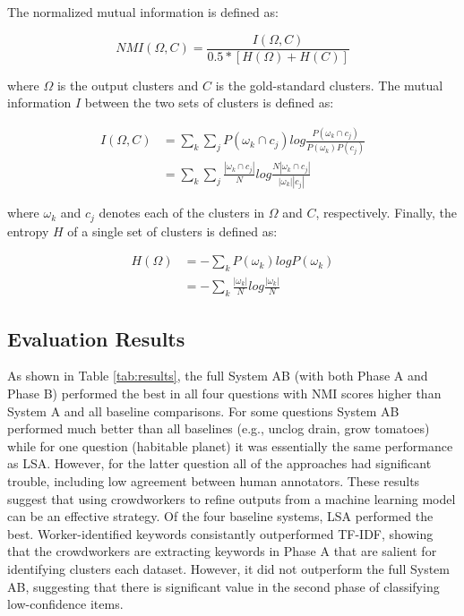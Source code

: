 The normalized mutual information is defined as:

\begin{equation}
NMI(\Omega, C) = \frac{I(\Omega, C)}{0.5 * [H(\Omega) + H(C)]}
\end{equation}

where $\Omega$ is the output clusters and $C$ is the gold-standard clusters.
The mutual information $I$ between the two sets of clusters is defined as:


\begin{equation}
	\begin{split}
I(\Omega, C) & = \sum_k \sum_j P(\omega_k \cap c_j) log \frac{P(\omega_k \cap c_j)}{P(\omega_k)P(c_j)} \\
             & = \sum_k \sum_j \frac{|\omega_k \cap c_j|}{N} log \frac{N|\omega_k \cap c_j|}{|\omega_k||c_j|}
	 \end{split}
 \end{equation}

where $\omega_k$ and $c_j$ denotes each of the clusters in $\Omega$ and $C$,
respectively.  Finally, the entropy $H$ of a single set of clusters is defined
as:

\begin{equation}
	\begin{split}
H(\Omega) & = - \sum_k P(\omega_k) log P(\omega_k) \\
          & = - \sum_k \frac{|\omega_k|}{N} log \frac{|\omega_k|}{N}
	\end{split}
\end{equation}


\subsection{Evaluation Results}

As shown in Table \ref{tab:results}, the full System AB (with both Phase A and
Phase B) performed the best in all four questions with NMI scores
higher than System A and all baseline comparisons. For some questions System AB
performed much better than all baselines (e.g., unclog drain, grow tomatoes)
while for one question (habitable planet) it was essentially the same performance as LSA.
However, for the latter question all of the approaches had significant trouble,
including low agreement between human annotators. These results suggest that using crowdworkers to refine outputs from a machine learning model can be an effective strategy. Of the four
baseline systems, LSA performed the best.  Worker-identified keywords consistantly outperformed TF-IDF, showing that the crowdworkers are extracting keywords in Phase A that are salient for identifying clusters each dataset. However, it did not outperform the
full System AB, suggesting that there is significant value in the second phase of
classifying low-confidence items.

